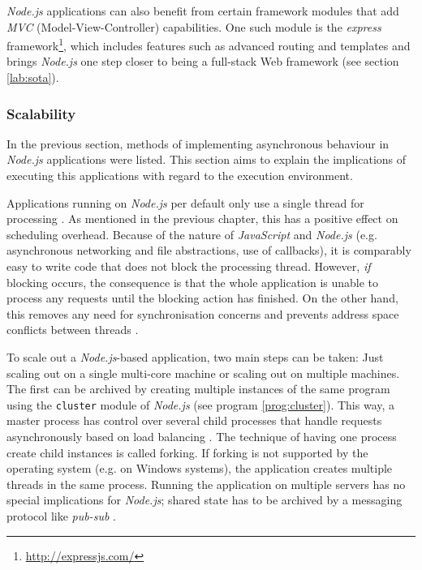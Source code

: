 \textit{Node.js} applications can also benefit from certain framework modules that add \textit{MVC} (Model-View-Controller) capabilities. One such module is the \textit{express} framework\footnote{\url{http://expressjs.com/}}, which includes features such as advanced routing and templates and brings \textit{Node.js} one step closer to being a full-stack Web framework (see section \ref{lab:sota}).

\subsubsection*{Scalability}
In the previous section, methods of implementing asynchronous behaviour in \textit{Node.js} applications were listed. This section aims to explain the implications of executing this applications with regard to the execution environment.

Applications running on \textit{Node.js} per default only use a single thread for processing \cite{node-loop}. As mentioned in the previous chapter, this has a positive effect on scheduling overhead. Because of the nature of \textit{JavaScript} and \textit{Node.js} (e.g. asynchronous networking and file abstractions, use of callbacks), it is comparably easy to write code that does not block the processing thread. However, \textit{if} blocking occurs, the consequence is that the whole application is unable to process any requests until the blocking action has finished. On the other hand, this removes any need for synchronisation concerns and prevents address space conflicts between threads \cite[p. 105]{Erb2012}.

To scale out a \textit{Node.js}-based application, two main steps can be taken: Just scaling out on a single multi-core machine or scaling out on multiple machines. The first can be archived by creating multiple instances of the same program using the \texttt{cluster} module of \textit{Node.js} (see program \ref{prog:cluster}). This way, a master process has control over several child processes that handle requests asynchronously based on load balancing \cite[p. 64]{Hughes-Croucher2012}. The technique of having one process create child instances is called forking. If forking is not supported by the operating system (e.g. on Windows systems), the application creates multiple threads in the same process. Running the application on multiple servers has no special implications for \textit{Node.js}; shared state has to be archived by a messaging protocol like \textit{pub-sub} \cite[p. 137]{Hughes-Croucher2012}.

